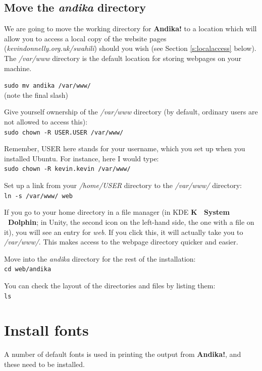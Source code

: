 \subsection{Move the \textit{andika} directory}

We are going to move the working directory for \textbf{Andika!} to a location which will allow you to access a local copy of the website pages (\textit{kevindonnelly.org.uk/swahili}) should you wish (see Section \ref{s:localaccess} below).  The \textit{/var/www} directory is the default location for storing webpages on your machine.

\verb|sudo mv andika /var/www/|\\
(note the final slash)

Give yourself ownership of the \textit{/var/www} directory (by default, ordinary users are not allowed to access this):\\
\verb|sudo chown -R USER.USER /var/www/|

Remember, USER here stands for your username, which you set up when you installed Ubuntu.  For instance, here I would type:\\
\verb|sudo chown -R kevin.kevin /var/www/|

Set up a link from your \textit{/home/USER} directory to the \textit{/var/www/} directory:\\
\verb|ln -s /var/www/ web|

If you go to your home directory in a file manager (in KDE \textbf{K \textrightarrow\ System \textrightarrow\ Dolphin}; in Unity, the second icon on the left-hand side, the one with a file on it), you will see an entry for \textit{web}.  If you click this, it will actually take you to \textit{/var/www/}.  This makes access to the webpage directory quicker and easier.

Move into the \textit{andika} directory for the rest of the installation:\\
\verb|cd web/andika|

You can check the layout of the directories and files by listing them:\\
\verb|ls|


\section{Install fonts}
\label{s:fonts}

A number of default fonts is used in printing the output from \textbf{Andika!}, and these need to be installed.


